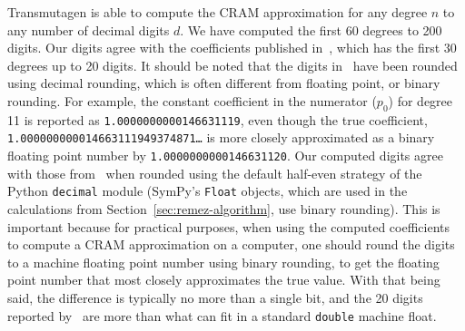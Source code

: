 Transmutagen is able to compute the CRAM approximation for any degree $n$ to
any number of decimal digits $d$. We have computed the first $60$ degrees to
200 digits. Our digits agree with the coefficients published
in~\cite{carpenter1984extended}, which has the first 30 degrees up to 20
digits. It should be noted that the digits in~\cite{carpenter1984extended}
have been rounded using decimal rounding, which is often different from
floating point, or binary rounding. For example, the constant coefficient in
the numerator ($p_0$) for degree 11 is reported as
\texttt{1.0000000000146631119}, even though the true coefficient,
\texttt{1.000000000014663111949374871\ldots} is more closely approximated as a
binary floating point number by \texttt{1.0000000000146631120}. Our computed
digits agree with those from~\cite{carpenter1984extended} when rounded using
the default half-even strategy of the Python \texttt{decimal} module (SymPy's
\texttt{Float} objects, which are used in the calculations from
Section~\ref{sec:remez-algorithm}, use binary rounding). This is important
because for practical purposes, when using the computed coefficients to
compute a CRAM approximation on a computer, one should round the digits to a
machine floating point number using binary rounding, to get the floating point
number that most closely approximates the true value. With that being said,
the difference is typically no more than a single bit, and the 20 digits
reported by~\cite{carpenter1984extended} are more than what can fit in a
standard \texttt{double} machine float.
